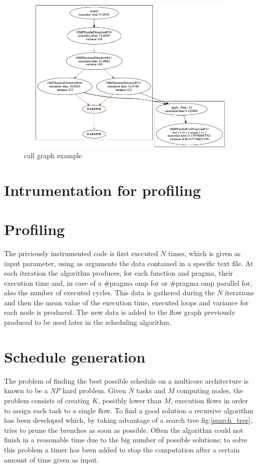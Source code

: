 \documentclass[a4paper,11pt,oneside]{book}
\begin{document}
\begin{figure}[ht!]
\centering
\includegraphics[width = 130mm, height = 76mm]{call_graph.png}
\caption{call graph example}
\label{call_graph}
\end{figure}


\section{Intrumentation for profiling}
\section{Profiling}

The priviously instrumented code is first executed $N$ times, which is given as input parameter, using as arguments the data contained in a specific text file. At each iteration the algorithm produces, for each function and pragma, their execution time and, in case of a $\#$pragma omp for or $\#$pragma omp parallel for, also the number of executed cycles. This data is gathered during the $N$ iterations and then the mean value of the execution time, executed loops and variance for each node is produced. The new data is added to the flow graph previously produced to be used later in the scheduling algorithm. 

\section{Schedule generation}

The problem of finding the best possible schedule on a multicore architecture is known to be a \emph{NP} hard problem. Given $N$ tasks and $M$ computing nodes, the problem consists of creating $K$, possibly lower than $M$, execution flows in order to assign each task to a single flow. To find a good solution a recursive algorithm has been developed which, by taking advantage of a search tree fig:\ref{search_tree}, tries to prune the brenches as soon as possible. Often the algorithm could not finish in a reasonable time due to the big number of possible solutions; to solve this problem a timer has been added to stop the computation after a certain amount of time given as input. \\
\end{document}
